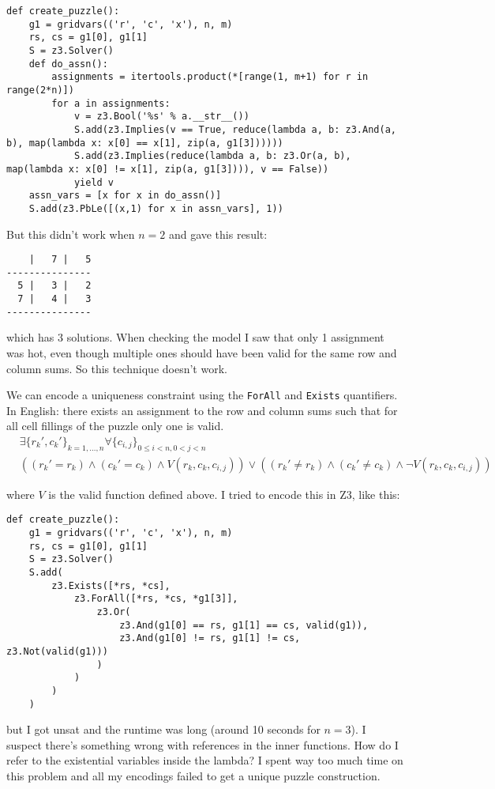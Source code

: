 \begin{enumerate}[label=(\alph*)]
  \begin{verbatim}
def create_puzzle():
    g1 = gridvars(('r', 'c', 'x'), n, m)
    rs, cs = g1[0], g1[1]
    S = z3.Solver()
    def do_assn():
        assignments = itertools.product(*[range(1, m+1) for r in range(2*n)])
        for a in assignments:
            v = z3.Bool('%s' % a.__str__())
            S.add(z3.Implies(v == True, reduce(lambda a, b: z3.And(a, b), map(lambda x: x[0] == x[1], zip(a, g1[3])))))
            S.add(z3.Implies(reduce(lambda a, b: z3.Or(a, b), map(lambda x: x[0] != x[1], zip(a, g1[3]))), v == False))
            yield v
    assn_vars = [x for x in do_assn()]
    S.add(z3.PbLe([(x,1) for x in assn_vars], 1))
  \end{verbatim}
  But this didn't work when $n = 2$ and gave this result:
  \begin{verbatim}
    |   7 |   5
---------------
  5 |   3 |   2
  7 |   4 |   3
---------------
  \end{verbatim}
  which has 3 solutions. When checking the model I saw that only 1 assignment was hot, even though multiple ones should have been valid for the same row and column sums. So this technique doesn't work.

  We can encode a uniqueness constraint using the \texttt{ForAll} and \texttt{Exists} quantifiers. In English: there exists an assignment to the row and column sums such that for all cell fillings of the puzzle only one is valid.
  \begin{align*}
    &\exists \{r_k', c_k'\}_{k = 1, \dots, n} \forall \{c_{i,j}\}_{0 \leq i < n, 0 < j < n} \\
    & ((r_k' = r_k) \land (c_k' = c_k) \land V(r_k, c_k, c_{i,j})) \lor ((r_k' \neq r_k) \land (c_k' \neq c_k) \land \lnot V(r_k, c_k, c_{i,j}))
  \end{align*}

  where $V$ is the valid function defined above. I tried to encode this in Z3, like this:
  \begin{verbatim}
def create_puzzle():
    g1 = gridvars(('r', 'c', 'x'), n, m)
    rs, cs = g1[0], g1[1]
    S = z3.Solver()
    S.add(
        z3.Exists([*rs, *cs],
            z3.ForAll([*rs, *cs, *g1[3]],
                z3.Or(
                    z3.And(g1[0] == rs, g1[1] == cs, valid(g1)),
                    z3.And(g1[0] != rs, g1[1] != cs, z3.Not(valid(g1)))
                )
            )
        )
    )
  \end{verbatim}

  but I got unsat and the runtime was long (around 10 seconds for $n = 3$). I suspect there's something wrong with references in the inner functions. How do I refer to the existential variables inside the lambda? I spent way too much time on this problem and all my encodings failed to get a unique puzzle construction.


\end{enumerate}
